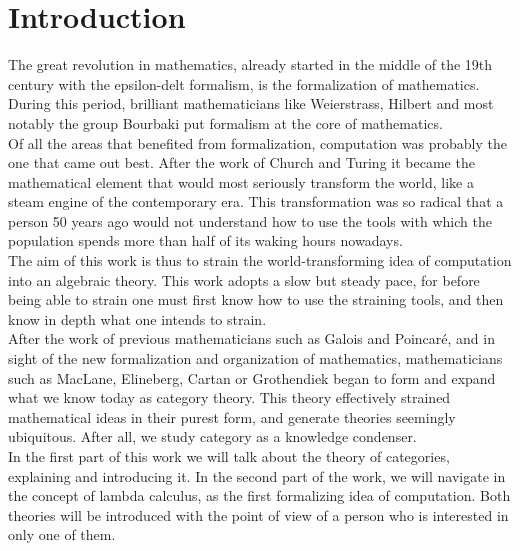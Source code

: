
\chapter{Introduction}


The great revolution in mathematics, already started in the middle of the 19th century with the epsilon-delt formalism, is the formalization of mathematics. During this period, brilliant mathematicians like Weierstrass, Hilbert and most notably the group  Bourbaki put formalism at the core of mathematics. \\

Of all the areas that benefited from formalization, computation was probably the one that came out best. After the work of Church and Turing it became the mathematical element that would most seriously transform the world, like a steam engine of the contemporary era. This transformation was so radical that a person 50 years ago would not understand how to use the tools with which the population spends more than half of its waking hours nowadays.\\

The aim of this work is thus to strain the world-transforming idea of computation into an algebraic theory. This work  adopts a slow but steady pace, for before being able to strain one must first know how to use the straining tools, and then know in depth what one intends to strain.  \\

After the work of previous mathematicians such as Galois and Poincaré, and in sight of the new formalization and organization of mathematics, mathematicians such as MacLane, Elineberg, Cartan or Grothendiek began to form and expand what we know today as category theory. This theory effectively strained mathematical ideas in their purest form, and generate theories seemingly ubiquitous. After all, we study category as a knowledge condenser.\\

In the first part of this work we will talk about the theory of categories, explaining and introducing it. In the second part of the work, we will navigate in the concept of lambda calculus, as the first formalizing idea of computation. Both theories will be introduced with the point of view of a person who is interested in only one of them.\\

